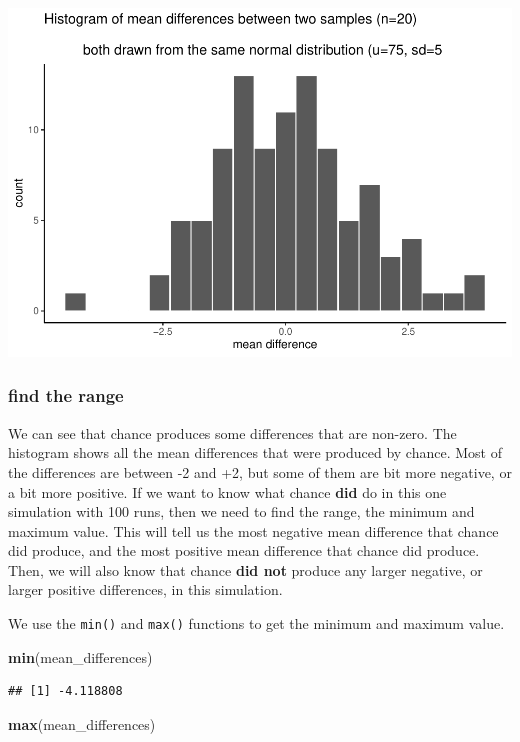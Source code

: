 \documentclass[]{book}
\newenvironment{Shaded}{\begin{snugshade}}{\end{snugshade}}
\newcommand{\KeywordTok}[1]{\textcolor[rgb]{0.13,0.29,0.53}{\textbf{#1}}}
\newcommand{\NormalTok}[1]{#1}
\begin{document}
\includegraphics{Statistics_Lab_files/figure-latex/unnamed-chunk-145-1.pdf}

\subsubsection{find the range}\label{find-the-range}

We can see that chance produces some differences that are non-zero. The
histogram shows all the mean differences that were produced by chance.
Most of the differences are between -2 and +2, but some of them are bit
more negative, or a bit more positive. If we want to know what chance
\textbf{did} do in this one simulation with 100 runs, then we need to
find the range, the minimum and maximum value. This will tell us the
most negative mean difference that chance did produce, and the most
positive mean difference that chance did produce. Then, we will also
know that chance \textbf{did not} produce any larger negative, or larger
positive differences, in this simulation.

We use the \texttt{min()} and \texttt{max()} functions to get the
minimum and maximum value.

\begin{Shaded}
\begin{Highlighting}[]
\KeywordTok{min}\NormalTok{(mean_differences)}
\end{Highlighting}
\end{Shaded}

\begin{verbatim}
## [1] -4.118808
\end{verbatim}

\begin{Shaded}
\begin{Highlighting}[]
\KeywordTok{max}\NormalTok{(mean_differences)}
\end{Highlighting}
\end{Shaded}
\end{document}
